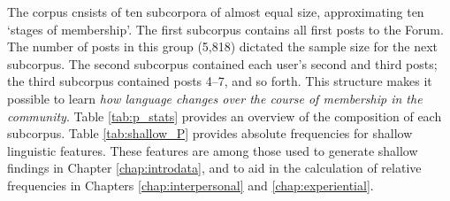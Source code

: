 \documentclass{article}
\renewcommand{\cite}{\parencite}
\begin{document}


The corpus cnsists of ten subcorpora of almost equal size, approximating ten `stages of membership'. The first subcorpus contains all first posts to the Forum. The number of posts in this group (5,818) dictated the sample size for the next subcorpus. The second subcorpus contained each user's second and third posts; the third subcorpus contained posts 4--7, and so forth. This structure makes it possible to learn \emph{how language changes over the course of membership in the community}. Table \ref{tab:p_stats} provides an overview of the composition of each subcorpus. Table \ref{tab:shallow_P} provides absolute frequencies for shallow linguistic features. These features are among those used to generate shallow findings in Chapter \ref{chap:introdata}, and to aid in the calculation of relative frequencies in Chapters \ref{chap:interpersonal} and \ref{chap:experiential}.
\end{document}
